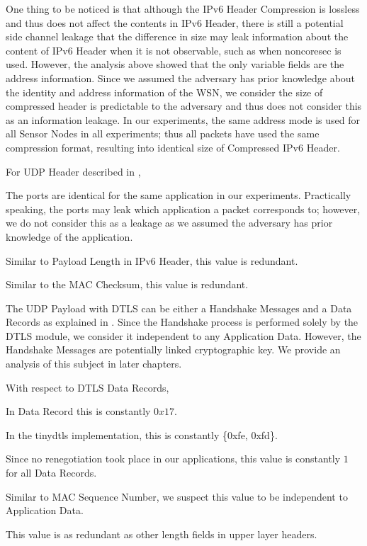 One thing to be noticed is that although the IPv6 Header Compression is lossless and thus does not affect the contents in IPv6 Header, there is still a potential side channel leakage that the difference in size may leak information about the content of IPv6 Header when it is not observable, such as when noncoresec is used. However, the analysis above showed that the only variable fields are the address information. Since we assumed the adversary has prior knowledge about the identity and address information of the WSN, we consider the size of compressed header is predictable to the adversary and thus does not consider this as an information leakage. In our experiments, the same address mode is used for all Sensor Nodes in all experiments; thus all packets have used the same compression format, resulting into identical size of Compressed IPv6 Header.

For UDP Header described in ,

\begin{description}[style=nextline]
	\item[Source and Destination Port]
	The ports are identical for the same application in our experiments. Practically speaking, the ports may leak which application a packet corresponds to; however, we do not consider this as a leakage as we assumed the adversary has prior knowledge of the application.
	\item[Payload Length]
	Similar to Payload Length in IPv6 Header, this value is redundant.
	\item[Checksum]
	Similar to the MAC Checksum, this value is redundant.
\end{description}

The UDP Payload with DTLS can be either a Handshake Messages and a Data Records as explained in  . Since the Handshake process is performed solely by the DTLS module, we consider it independent to any Application Data. However,  the Handshake Messages are potentially linked cryptographic key. We provide an analysis of this subject in later chapters.

With respect to DTLS Data Records,

\begin{description}[style=nextline]
	\item[Content Type]
	In Data Record this is constantly $0x17$.
	\item[Protocol Version]
	In the tinydtls implementation, this is constantly \{0xfe, 0xfd\}.
	\item[Epoch]
	Since no renegotiation took place in our applications, this value is constantly $1$ for all Data Records.
	\item[Sequence Number]
	Similar to MAC Sequence Number, we suspect this value to be independent to Application Data.
	\item[Length]
	This value is as redundant as other length fields in upper layer headers.
\end{description}

